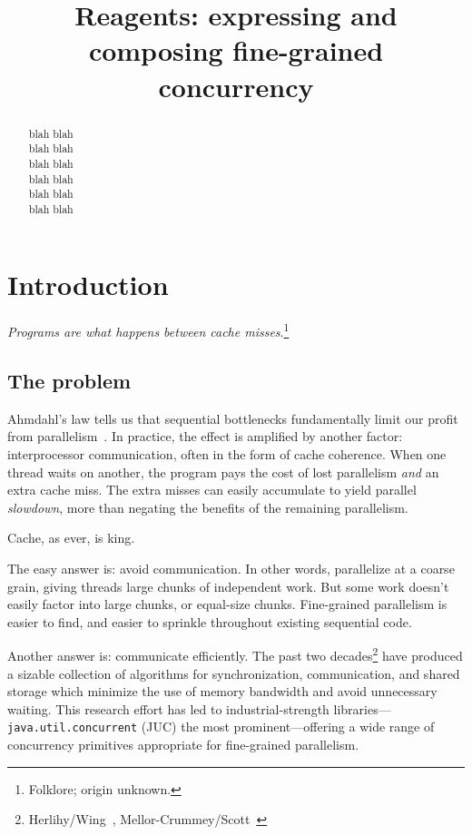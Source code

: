 \documentclass[preprint,nocopyrightspace]{sigplanconf}
\begin{document}
\authorinfo{}{}{}

\title{Reagents: expressing and composing fine-grained concurrency}
\maketitle

\begin{abstract}
blah blah\\
blah blah\\
blah blah\\
blah blah\\
blah blah\\
blah blah
\end{abstract}

\section{Introduction}

\emph{Programs are what happens between cache
  misses}.\footnote{Folklore; origin unknown.}

\subsection*{The problem}

Ahmdahl's law tells us that sequential bottlenecks fundamentally limit our
profit from parallelism~\cite{?}.  In practice, the effect is amplified by
another factor: interprocessor communication, often in the form of cache
coherence.  When one thread waits on another, the program pays the cost of
lost parallelism \emph{and} an extra cache miss.  The extra misses can easily
accumulate to yield parallel \emph{slowdown}, more than negating the benefits
of the remaining parallelism.

Cache, as ever, is king.

The easy answer is: avoid communication.  In other words, parallelize at a
coarse grain, giving threads large chunks of independent work.  But some work
doesn't easily factor into large chunks, or equal-size chunks.  Fine-grained
parallelism is easier to find, and easier to sprinkle throughout existing
sequential code.

Another answer is: communicate efficiently.  The past two
decades\footnote{Herlihy/Wing~\cite{?}, Mellor-Crummey/Scott~\cite{?}} have
produced a sizable collection of algorithms for synchronization, communication,
and shared storage which minimize the use of memory bandwidth and avoid
unnecessary waiting.  This research effort has led to industrial-strength
libraries---\texttt{java.util.concurrent} (JUC) the most prominent---offering a
wide range of concurrency primitives appropriate for fine-grained parallelism.
\end{document}
